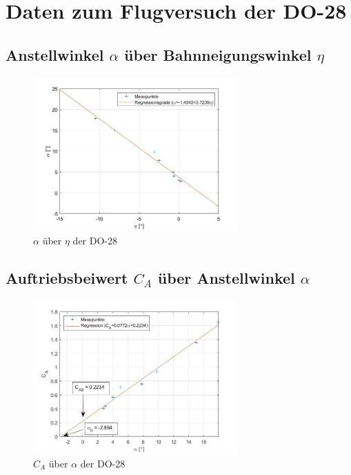 \section{Daten zum Flugversuch der DO-28}

\subsection{Anstellwinkel $\alpha$ über Bahnneigungswinkel $\eta$}

\begin{figure}[H]
	\centering	\includegraphics[width=0.7\textwidth]{./Bilder/alpha_eta_plot.jpg}
	\caption{$\alpha$ über $\eta$ der DO-28}
	\label{fig:alpha_eta_DO28}
\end{figure}

\subsection{Auftriebsbeiwert $C_{A}$ über Anstellwinkel $\alpha$}

\begin{figure}[H]
	\centering	\includegraphics[width=0.7\textwidth]{./Bilder/CA_alpha_plot.jpg}
	\caption{$C_{A}$ über $\alpha$ der DO-28}
	\label{fig:CA_alpha_DO28}
\end{figure}

